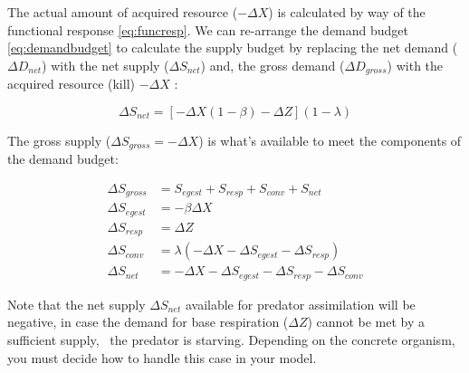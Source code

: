 The actual amount of acquired resource ($-\Delta X$) is calculated by way of the functional response \eqref{eq:funcresp}. We can re-arrange the demand budget \eqref{eq:demandbudget} to calculate the supply budget by replacing the net demand ($\Delta D_{net}$) with the net supply ($\Delta S_{net}$) and, the gross demand ($\Delta D_{gross}$) with the acquired resource (kill) $-\Delta X$ :

\begin{equation}
\Delta S_{net} =\left[-\Delta X(1-\beta)-\Delta Z\right](1-\lambda)\label{eq:supplybudget}
\end{equation}

The gross supply ($\Delta S_{gross} = -\Delta X$) is what's available to meet the components of the demand budget:

\begin{equation}
  \begin{aligned}
    \Delta S_{gross} &= S_{egest} + S_{resp} + S_{conv} + S_{net} \\
    \Delta S_{egest} &= -\beta \Delta X \\
    \Delta S_{resp}  &= \Delta Z \\
    \Delta S_{conv}  &= \lambda(-\Delta X - \Delta S_{egest} - \Delta S_{resp}) \\
    \Delta S_{net}   &= -\Delta X - \Delta S_{egest} - \Delta S_{resp} - \Delta S_{conv}
  \end{aligned} \label{eq:supplyallocation}
\end{equation}

Note that the net supply $\Delta S_{net}$ available for predator assimilation will be negative, in case the demand for base respiration ($\Delta Z$) cannot be met by a sufficient supply, \ie\ the predator is starving. Depending on the concrete organism, you must decide how to handle this case in your model.

